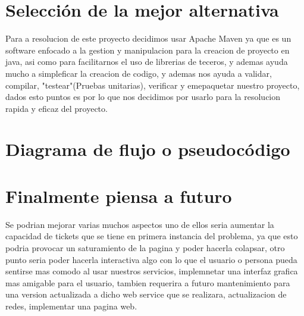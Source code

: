 \documentclass[30pt]{article}
\theoremstyle{definition}
\begin{document}
\section{Selección de la mejor alternativa}

{\large Para a resolucion de este proyecto decidimos usar Apache Maven ya que es un software enfocado a la gestion y manipulacion para la creacion de proyecto en java, asi como para facilitarnos el uso de librerias de teceros, y ademas ayuda mucho a simpleficar la creacion de codigo, y ademas nos ayuda a validar, compilar, "testear"(Pruebas unitarias), verificar y emepaquetar nuestro proyecto, dados esto puntos es por lo que nos decidimos por usarlo para la resolucion rapida y eficaz del proyecto.}\\


\section{Diagrama de flujo o pseudocódigo}

\newpage    
\section{Finalmente piensa a futuro}

{\large Se podrian mejorar varias muchos aspectos uno de ellos seria aumentar la capacidad de tickets que se tiene en primera instancia del problema, ya que esto podria provocar un saturamiento de la pagina y poder hacerla colapsar, otro punto seria poder hacerla interactiva algo con lo que el usuario o persona pueda sentirse mas comodo al usar nuestros servicios, implemnetar una interfaz grafica mas amigable para el usuario, tambien requerira a futuro mantenimiento para una version actualizada a dicho web service que se realizara, actualizacion de redes, implementar una pagina web. } 
\end{document}
